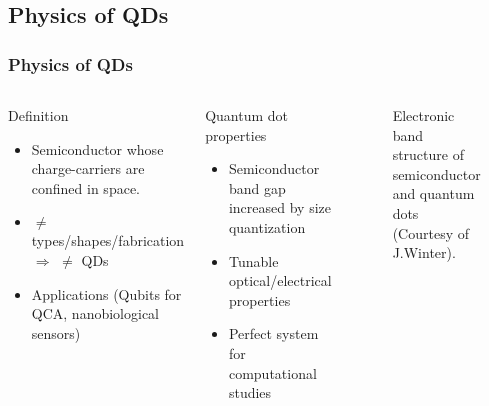 \documentclass[xcolor=pdftex,hyperref={pdfpagelabels=false},table]{beamer}
\begin{document}
\subsection{Physics of QDs}
\begin{frame}
\frametitle{Physics of QDs}
\begin{columns}[T,c]
\column{5cm}
\scriptsize
\begin{block}{Definition}
\begin{itemize}
\item Semiconductor whose charge-carriers are confined in space.
\item $\neq$ types/shapes/fabrication \newline $\Rightarrow$ $\neq$ QDs
\item Applications (Qubits for QCA, nanobiological sensors)
\end{itemize}
  \end{block}

\begin{block}{Quantum dot properties}
\begin{itemize}
\item Semiconductor band gap increased by size quantization
\item Tunable optical/electrical properties
\item Perfect system for computational studies
\end{itemize}
  \end{block}
\column{6cm}
\begin{figure}
	\begin{center}
	\vspace{-5pt}
	\caption{Electronic band structure of semiconductor and quantum dots (Courtesy of J.Winter\cite{Winter2004}).}%
	\vspace{-5pt}
	\end{center}
\end{figure}
\end{columns}
\end{frame}
\end{document}
